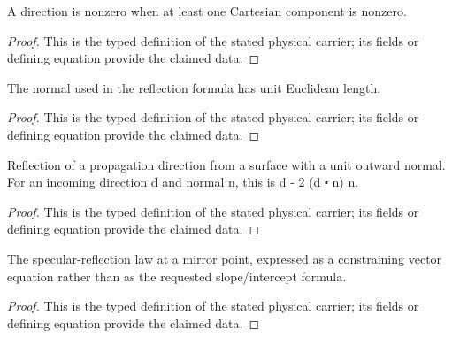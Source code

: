 \begin{definition}
  \label{def:physics:IPhO_2026_2_C_1:aux004}
  A direction is nonzero when at least one Cartesian component is nonzero.
\end{definition}
\begin{proof}
  This is the typed definition of the stated physical carrier; its fields or defining equation provide the claimed data.
\end{proof}

\begin{definition}
  \label{def:physics:IPhO_2026_2_C_1:aux005}
  The normal used in the reflection formula has unit Euclidean length.
\end{definition}
\begin{proof}
  This is the typed definition of the stated physical carrier; its fields or defining equation provide the claimed data.
\end{proof}

\begin{definition}
  \label{def:physics:IPhO_2026_2_C_1:aux006}
  Reflection of a propagation direction from a surface with a unit outward normal. For an incoming direction d and normal n, this is d - 2 (d ⬝ n) n.
\end{definition}
\begin{proof}
  This is the typed definition of the stated physical carrier; its fields or defining equation provide the claimed data.
\end{proof}

\begin{definition}
  \label{def:physics:IPhO_2026_2_C_1:aux007}
  The specular-reflection law at a mirror point, expressed as a constraining vector equation rather than as the requested slope/intercept formula.
\end{definition}
\begin{proof}
  This is the typed definition of the stated physical carrier; its fields or defining equation provide the claimed data.
\end{proof}

